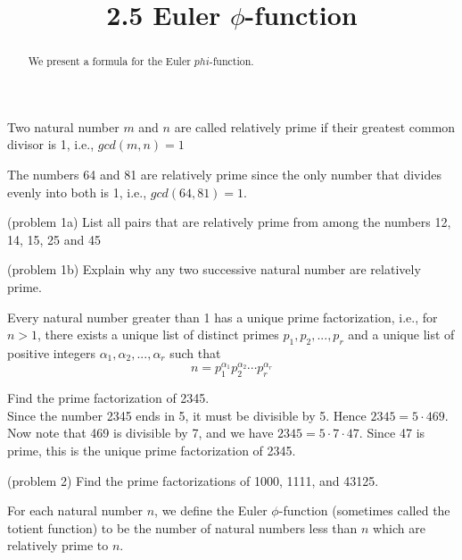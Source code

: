 \documentclass[handout]{ximera}
\title{2.5 Euler $\phi$-function}
\begin{document}
\begin{abstract}
We present a formula for the Euler $phi$-function.
\end{abstract}

\maketitle


\begin{definition}
Two natural number $m$ and $n$ are called relatively prime if their greatest common divisor is 1, i.e., $gcd(m,n) = 1$
\end{definition}

\begin{example}[example 1]
The numbers 64 and 81 are relatively prime since the only number that divides evenly into both is 1, i.e., $gcd(64,81) = 1$.
\end{example}

\begin{problem}(problem 1a)
List all pairs that are relatively prime from among the numbers 12, 14, 15, 25 and 45
\end{problem}

\begin{problem}(problem 1b)
Explain why any two successive natural number are relatively prime.
\end{problem}

\begin{theorem}
Every natural number greater than 1 has a unique prime factorization, i.e., for $n >1$, there exists a 
unique list of distinct primes
$p_1, p_2, ..., p_r$ and a unique list of positive integers $\alpha_1, \alpha_2, ..., \alpha_r$ such that
\[
n = p_1^{\alpha_1}p_2^{\alpha_2}\cdots p_r^{\alpha_r}
\]
\end{theorem}


\begin{example}[example 2]
Find the prime factorization of 2345.\\
Since the number 2345 ends in 5, it must be divisible by 5.  Hence $2345 = 5 \cdot 469$. Now note that 469 is divisible by 7,
and we have $2345 = 5 \cdot 7 \cdot 47$. Since 47 is prime, this is the unique prime factorization of 2345.
\end{example}

\begin{problem}(problem 2)
Find the prime factorizations of 1000, 1111, and 43125.
\end{problem}
\begin{definition}
For each natural number $n$, we define the Euler $\phi$-function (sometimes called the totient function) to be the 
number of natural numbers less than $n$ which are relatively prime to $n$.
\end{definition}
\end{document}
